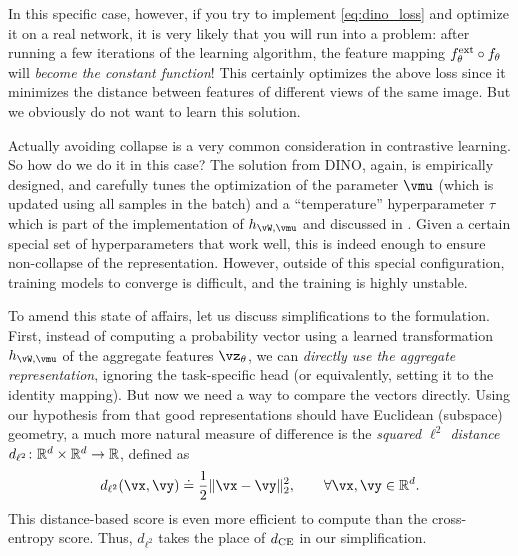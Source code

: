 \documentclass[../../book-main.tex]{subfiles}
\begin{document}
In this specific case, however, if you try to implement \eqref{eq:dino_loss} and optimize it on a real network, it is very likely that you will run into a problem: after running a few iterations of the learning algorithm, the feature mapping \(f_{\theta}^{\mathrm{ext}} \circ f_{\theta}\) will \textit{become the constant function}! This certainly optimizes the above loss since it minimizes the distance between features of different views of the same image. But we obviously do not want to learn this solution. 

Actually avoiding collapse is a very common consideration in contrastive learning. So how do we do it in this case? The solution from DINO, again, is empirically designed, and carefully tunes the optimization of the parameter \(\vmu\) (which is updated using all samples in the batch) and a ``temperature'' hyperparameter \(\tau\) which is part of the implementation of \(h_{\vW, \vmu}\) and discussed in . Given a certain special set of hyperparameters that work well, this is indeed enough to ensure non-collapse of the representation. However, outside of this special configuration, training models to converge is difficult, and the training is highly unstable. 

To amend this state of affairs, let us discuss simplifications to the formulation. First, instead of computing a probability vector using a learned transformation \(h_{\vW, \vmu}\) of the aggregate features \(\vz_{\theta}\), we can \textit{directly use the aggregate representation}, ignoring the task-specific head (or equivalently, setting it to the identity mapping). But now we need a way to compare the vectors directly. Using our hypothesis from  that good representations should have Euclidean (subspace) geometry, a much more natural measure of difference is the \textit{squared \(\ell^{2}\) distance} \(d_{\ell^{2}} \colon \mathbb{R}^{d} \times \mathbb{R}^{d} \to \mathbb{R}\), defined as 
\begin{equation}\label{eq:cosine_similarity}
    d_{\ell^{2}}(\vx, \vy) \doteq \frac{1}{2}\norm{\vx - \vy}_{2}^{2}, \qquad  \forall \vx, \vy \in \R^{d}.
\end{equation}
This distance-based score is even more efficient to compute than the cross-entropy score. Thus, \(d_{\ell^{2}}\) takes the place of \(d_{\operatorname{CE}}\) in our simplification. 
\end{document}

